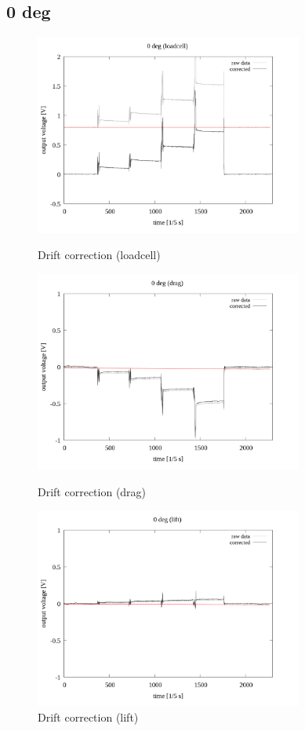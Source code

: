 \documentclass[twocolumn,a4j]{jsarticle}
\begin{document}
\subsection{0 deg}
\begin{figure}[htbp]
    \footnotesize
    \begin{center}
        \includegraphics[width=88mm]{../images/drift/0_loadcell_drift.png}
        \caption{Drift correction (loadcell)}
        \includegraphics[width=88mm]{../images/drift/0_drag_drift.png}
        \caption{Drift correction (drag)}
        \includegraphics[width=88mm]{../images/drift/0_lift_drift.png}
        \caption{Drift correction (lift)}
    \end{center}
\end{figure}
\end{document}
